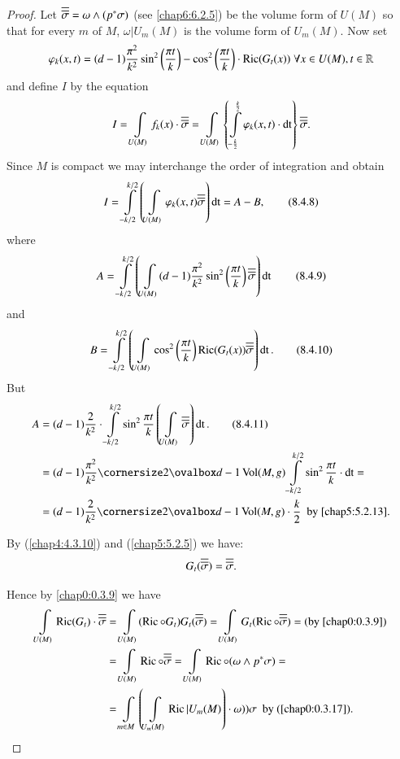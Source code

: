 \begin{proof}
Let $\overline{\overline{\sigma}}=\omega\wedge (p^{\ast}\sigma)$ (see \eqref{chap6:6.2.5})
be the volume form of $U(M)$ so that for every $m$ of $M$,
$\omega|U_{m}(M)$ is the volume form of $U_{m}(M)$. Now set
$$
\varphi_{k}(x,t)=(d-1)\frac{\pi^{2}}{k^{2}} \sin^{2}\left(\frac{\pi
  t}{k}\right) - \cos^{2}\left(\frac{\pi t}{k}\right)\cdot 
\operatorname{Ric}(G_{t}(x)) \; \forall x\in U(M), t\in \mathbb{R}
$$
and define $I$ by the equation
$$
I=\int\limits_{U(M)}f_{k}(x)\cdot\overline{\overline{\sigma}}=\int\limits_{U(M)}\left\{\int\limits^{\frac{k}{2}}_{-\frac{k}{2}}\varphi_{k}(x,t)\cdot
\operatorname{dt}\right\}\overline{\overline{\sigma}}.
$$
Since $M$ is compact we may interchange the order of integration and
obtain 
\begin{equation*}
I=\int\limits^{k/2}_{-k/2}\left(\int\limits_{U(M)}\varphi_{k}(x,t)\overline{\overline{\sigma}}\right)\operatorname{dt}=A-B,\tag{8.4.8}\label{chap8:8.4.8}
\end{equation*}
where
\begin{equation*}
A=\int\limits^{k/2}_{-k/2}\left(\int\limits_{U(M)}(d-1)
\dfrac{\pi^{2}}{k^{2}}\sin^{2} \left(\frac{\pi t}{k}\right)
\overline{\overline{\sigma}}\right)\operatorname{dt}\tag{8.4.9}\label{chap8:8.4.9}  
\end{equation*}
and
\begin{equation*}
B=\int\limits^{k/2}_{-k/2} \left(\int\limits_{U(M)}
\cos^{2}\left(\frac{\pi t}{k}\right) \operatorname{Ric}(G_{t}(x))\overline{\overline{\sigma}}\right)\operatorname{dt}. \tag{8.4.10}\label{chap8:8.4.10} 
\end{equation*}
But\pageoriginale
\begin{align*}
A &=(d-1)\frac{2}{k^{2}}\cdot
\int\limits^{k/2}_{-k/2}\sin^{2}\frac{\pi t}{k}
\left(\int\limits_{U(M)}\oob{\sigma}\right)\dt.\tag{8.4.11}\label{chap8:8.4.11}\\ 
&=
(d-1)\frac{\pi^{2}}{k^{2}}\oval{d-1}\Vol(M,g)\int\limits^{k/2}_{-k/2}\sin^{2}\frac{\pi
  t}{k}\cdot 
\dt=\\
&= (d-1)\frac{2}{k^{2}}\oval{d-1}\Vol(M,g)\cdot\frac{k}{2}\text{ \ by
  \eqref{chap5:5.2.13}.}
\end{align*}

By (\ref{chap4:4.3.10}) and (\ref{chap5:5.2.5}) we have:
$$
G_{t}(\overline{\overline{\sigma}})=\overline{\overline{\sigma}}.
$$

Hence by \eqref{chap0:0.3.9} we have
\begin{align*}
\int\limits_{U(M)}\operatorname{Ric}(G_{t})\cdot\overline{\overline{\sigma}} &=
\int\limits_{U(M)}(\operatorname{Ric} \circ
G_{t})G_{t}(\overline{\overline{\sigma}})=\int\limits_{U(M)}G_{t}(\operatorname{Ric}
\circ\overline{\overline{\sigma}})=\text{(by \eqref{chap0:0.3.9})}\\
&= \int\limits_{U(M)}\operatorname{Ric}\circ\overline{\overline{\sigma}}=\int\limits_{U(M)}\operatorname{Ric}\circ
(\omega\wedge p^{\ast}\sigma)=\\
&=\int\limits_{m\in M}\left(\int\limits_{U_{m}(M)}\operatorname{Ric} |
U_{m}(M)\right)\cdot \omega))\sigma\text{ \  by (\ref{chap0:0.3.17})}.
\end{align*}


\end{proof}
